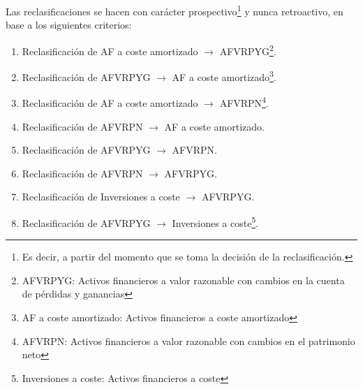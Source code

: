 Las reclasificaciones se hacen con carácter prospectivo\footnote{Es decir, a partir del momento que se toma la decisión de la reclasificación.} y nunca retroactivo, en base a los siguientes criterios:
\begin{enumerate}
    \item Reclasificación de AF a coste amortizado $\rightarrow$ AFVRPYG\footnote{AFVRPYG: Activos financieros a valor razonable con cambios en la cuenta de pérdidas y ganancias}.
    \item Reclasificación de AFVRPYG $\rightarrow$ AF a coste amortizado\footnote{AF a coste amortizado: Activos financieros a coste amortizado}.
    \item Reclasificación de AF a coste amortizado $\rightarrow$ AFVRPN\footnote{AFVRPN: Activos financieros a valor razonable con cambios en el patrimonio neto}.
    \item Reclasificación de AFVRPN $\rightarrow$ AF a coste amortizado.
    \item Reclasificación de AFVRPYG $\rightarrow$ AFVRPN.
    \item Reclasificación de AFVRPN $\rightarrow$ AFVRPYG.
    \item Reclasificación de Inversiones a coste $\rightarrow$ AFVRPYG.
    \item Reclasificación de AFVRPYG $\rightarrow$ Inversiones a coste\footnote{Inversiones a coste: Activos financieros a coste}.
\end{enumerate}

